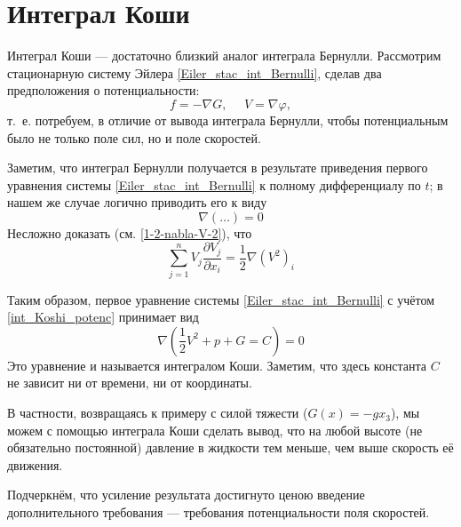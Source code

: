 \section{Интеграл Коши}

Интеграл Коши --- достаточно близкий аналог интеграла Бернулли.
Рассмотрим стационарную систему Эйлера \eqref{Eiler_stac_int_Bernulli},
сделав два предположения о потенциальности:
\begin{equation} \label{int_Koshi_potenc}
	f = -\nabla G,~~~~~~ V = \nabla \varphi,
\end{equation}
т.~е. потребуем, в отличие от вывода интеграла Бернулли,
чтобы потенциальным было не только поле сил, но и поле скоростей.

Заметим, что интеграл Бернулли получается в результате приведения первого уравнения системы
\eqref{Eiler_stac_int_Bernulli} к полному дифференциалу по $t$;
в нашем же случае логично приводить его к виду
$$
	\nabla(\dots) = 0
$$
Несложно доказать (см. \eqref{1-2-nabla-V-2}), что
$$
	\sum\limits_{j=1}^n V_j \frac{\partial V_j}{\partial x_i} = \frac{1}{2}\nabla(V^2)_i
$$

Таким образом, первое уравнение системы \eqref{Eiler_stac_int_Bernulli} с учётом \eqref{int_Koshi_potenc}
принимает вид
$$
	\nabla \left(
		\frac{1}{2}V^2 + p + G = C
	\right) = 0
$$
Это уравнение и называется интегралом Коши.
Заметим, что здесь константа $C$ не зависит ни от времени, ни от координаты.

В частности, возвращаясь к примеру с силой тяжести ($G(x) = -gx_3$),
мы можем с помощью интеграла Коши сделать вывод,
что на любой высоте (не обязательно постоянной) давление в жидкости тем меньше,
чем выше скорость её движения.

Подчеркнём, что усиление результата достигнуто ценою введение дополнительного требования ---
требования потенциальности поля скоростей.
